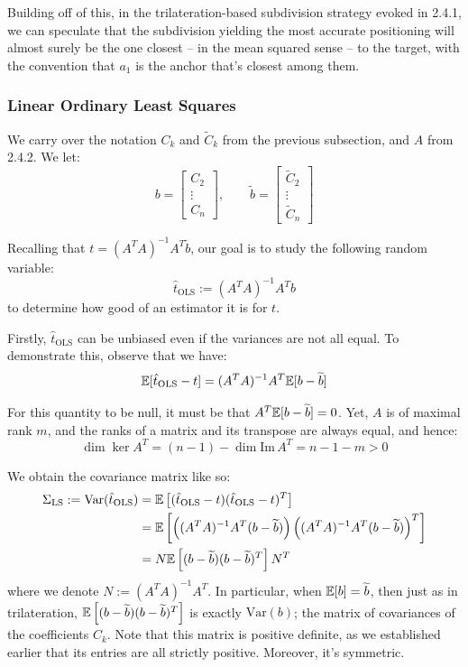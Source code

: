 Building off of this, in the trilateration-based subdivision strategy evoked in 2.4.1, we can speculate that the subdivision yielding the most accurate positioning will almost surely be the one closest -- in the mean squared sense -- to the target, with the convention that $a_1$ is the anchor that's closest among them.

\subsubsection{Linear Ordinary Least Squares}
We carry over the notation $C_k$ and $\widetilde C_k$ from the previous subsection, and $A$ from 2.4.2. We let:
\[
    b=
    \begin{bmatrix}
        C_2 \\ \vdots \\ C_n
    \end{bmatrix}, \qquad
    \widetilde b=
    \begin{bmatrix}
        \widetilde C_2 \\ \vdots \\ \widetilde C_n
    \end{bmatrix}
\]

Recalling that $t=(A^TA)^{-1}A^T\widetilde b$, our goal is to study the following random variable:
\[
    \hat t_\text{OLS} := (A^TA)^{-1}A^Tb
\]
to determine how good of an estimator it is for $t$.

Firstly, $\hat t_\text{OLS}$ can be unbiased even if the variances are not all equal. To demonstrate this, observe that we have:
\[
    \mathbb E[\hat t_\text{OLS}-t] = (A^TA)^{-1}A^T\mathbb E[b-\widetilde b]
\]

For this quantity to be null, it must be that $A^T\mathbb E[b-\widetilde b] = 0$. Yet, $A$ is of maximal rank $m$, and the ranks of a matrix and its transpose are always equal, and hence:
\[
    \dim\ker A^T = (n-1) - \dim\mathrm{Im}\, A^T = n-1-m > 0
\]

We obtain the covariance matrix like so:
\begin{align*}
    \Sigma_\text{LS} := \mathrm{Var}(\hat t_\text{OLS})
    &= \mathbb E\left[(\hat t_\text{OLS} - t)(\hat t_\text{OLS} - t)^T \right] \\
    &= \mathbb E\left[\left((A^TA)^{-1}A^T(b-\widetilde b)\right)\left((A^TA)^{-1}A^T(b-\widetilde b)\right)^T \right] \\
    &= N\mathbb E\left[(b-\widetilde b)(b-\widetilde b)^T\right]N^T
\end{align*}
where we denote $N := (A^TA)^{-1}A^T$. In particular, when $\mathbb E[b]=\widetilde b$, then just as in trilateration, $\mathbb E\left[(b-\widetilde b)(b-\widetilde b)^T\right]$ is exactly $\mathrm{Var}(b)$; the matrix of covariances of the coefficients $C_k$. Note that this matrix is positive definite, as we established earlier that its entries are all strictly positive. Moreover, it's symmetric.

